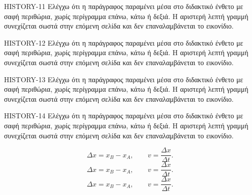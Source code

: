 \begin{HistoryBox}
HISTORY-11 Ελέγχω ότι η παράγραφος παραμένει μέσα στο διδακτικό ένθετο με σαφή περιθώρια, χωρίς περίγραμμα επάνω, κάτω ή δεξιά. Η αριστερή λεπτή γραμμή συνεχίζεται σωστά στην επόμενη σελίδα και δεν επαναλαμβάνεται το εικονίδιο.\par
HISTORY-12 Ελέγχω ότι η παράγραφος παραμένει μέσα στο διδακτικό ένθετο με σαφή περιθώρια, χωρίς περίγραμμα επάνω, κάτω ή δεξιά. Η αριστερή λεπτή γραμμή συνεχίζεται σωστά στην επόμενη σελίδα και δεν επαναλαμβάνεται το εικονίδιο.\par
HISTORY-13 Ελέγχω ότι η παράγραφος παραμένει μέσα στο διδακτικό ένθετο με σαφή περιθώρια, χωρίς περίγραμμα επάνω, κάτω ή δεξιά. Η αριστερή λεπτή γραμμή συνεχίζεται σωστά στην επόμενη σελίδα και δεν επαναλαμβάνεται το εικονίδιο.\par
HISTORY-14 Ελέγχω ότι η παράγραφος παραμένει μέσα στο διδακτικό ένθετο με σαφή περιθώρια, χωρίς περίγραμμα επάνω, κάτω ή δεξιά. Η αριστερή λεπτή γραμμή συνεχίζεται σωστά στην επόμενη σελίδα και δεν επαναλαμβάνεται το εικονίδιο.\par
\[\Delta x=x_B-x_A,\qquad v=\frac{\Delta x}{\Delta t}.\]
\[\Delta x=x_B-x_A,\qquad v=\frac{\Delta x}{\Delta t}.\]
\[\Delta x=x_B-x_A,\qquad v=\frac{\Delta x}{\Delta t}.\]
\end{HistoryBox}
